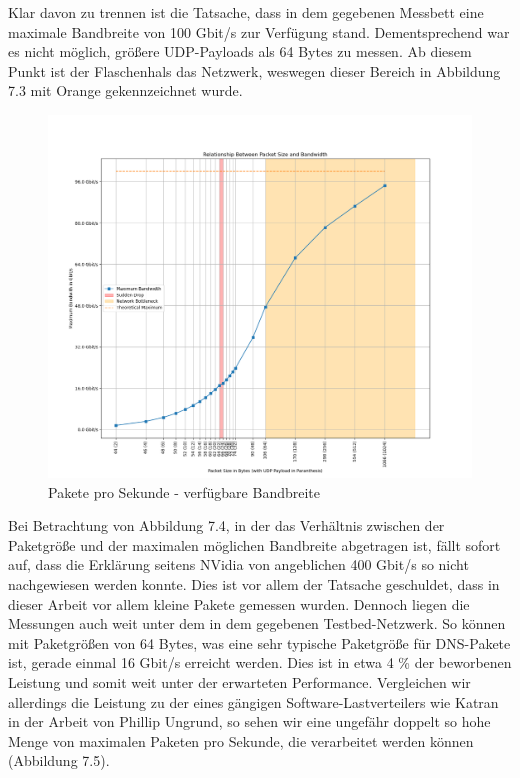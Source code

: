 Klar davon zu trennen ist die Tatsache, dass in dem gegebenen Messbett eine maximale Bandbreite von 100 Gbit/s zur Verfügung stand. Dementsprechend war es nicht möglich, größere UDP-Payloads als 64 Bytes zu messen. Ab diesem Punkt ist der Flaschenhals das Netzwerk, weswegen dieser Bereich in Abbildung 7.3 mit Orange gekennzeichnet wurde.
\begin{figure}
    \centering
    \includegraphics[width=1\linewidth]{images/pps_bandwidth.png}
    \caption{Pakete pro Sekunde - verfügbare Bandbreite}
    \label{fig:enter-label}
\end{figure}
Bei Betrachtung von Abbildung 7.4, in der das Verhältnis zwischen der Paketgröße und der maximalen möglichen Bandbreite abgetragen ist, fällt sofort auf, dass die Erklärung seitens NVidia von angeblichen 400 Gbit/s so nicht nachgewiesen werden konnte. Dies ist vor allem der Tatsache geschuldet, dass in dieser Arbeit vor allem kleine Pakete gemessen wurden. Dennoch liegen die Messungen auch weit unter dem in dem gegebenen Testbed-Netzwerk. So können mit Paketgrößen von 64 Bytes, was eine sehr typische Paketgröße für DNS-Pakete ist, gerade einmal 16 Gbit/s erreicht werden. Dies ist in etwa 4 \% der beworbenen Leistung und somit weit unter der erwarteten Performance. Vergleichen wir allerdings die Leistung zu der eines gängigen Software-Lastverteilers wie Katran in der Arbeit von Phillip Ungrund, so sehen wir eine ungefähr doppelt so hohe Menge von maximalen Paketen pro Sekunde, die verarbeitet werden können \cite{ungrund} (Abbildung 7.5). 

